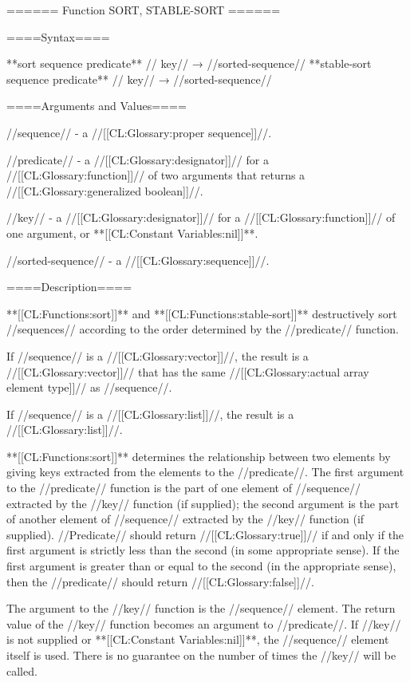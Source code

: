 ====== Function SORT, STABLE-SORT ======

====Syntax====

**sort {sequence predicate** //\key} key// → //sorted-sequence// **stable-sort {sequence predicate** //\key} key// → //sorted-sequence//

====Arguments and Values====

//sequence// - a //[[CL:Glossary:proper sequence]]//.

//predicate// - a //[[CL:Glossary:designator]]// for a //[[CL:Glossary:function]]// of two arguments that returns a //[[CL:Glossary:generalized boolean]]//.

//key// - a //[[CL:Glossary:designator]]// for a //[[CL:Glossary:function]]// of one argument, or **[[CL:Constant Variables:nil]]**.

//sorted-sequence// - a //[[CL:Glossary:sequence]]//.

====Description====

**[[CL:Functions:sort]]** and **[[CL:Functions:stable-sort]]** destructively sort //sequences// according to the order determined by the //predicate// function.

If //sequence// is a //[[CL:Glossary:vector]]//, the result is a //[[CL:Glossary:vector]]// that has the same //[[CL:Glossary:actual array element type]]// as //sequence//.

If //sequence// is a //[[CL:Glossary:list]]//, the result is a //[[CL:Glossary:list]]//.

**[[CL:Functions:sort]]** determines the relationship between two elements by giving keys extracted from the elements to the //predicate//. The first argument to the //predicate// function is the part of one element of //sequence// extracted by the //key// function (if supplied); the second argument is the part of another element of //sequence// extracted by the //key// function (if supplied). //Predicate// should return //[[CL:Glossary:true]]// if and only if the first argument is strictly less than the second (in some appropriate sense). If the first argument is greater than or equal to the second (in the appropriate sense), then the //predicate// should return //[[CL:Glossary:false]]//.

The argument to the //key// function is the //sequence// element. The return value of the //key// function becomes an argument to //predicate//. If //key// is not supplied or **[[CL:Constant Variables:nil]]**, the //sequence// element itself is used. There is no guarantee on the number of times the //key// will be called.

